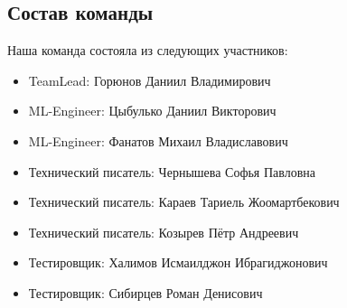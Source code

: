     \subsection{Состав команды}
    Наша команда состояла из следующих участников:
    \begin{itemize} 
        \item TeamLead:	 Горюнов Даниил Владимирович
        \item ML-Engineer: Цыбулько Даниил Викторович
        \item ML-Engineer: Фанатов Михаил Владиславович
        \item Технический писатель: Чернышева Софья Павловна
        \item Технический писатель: Караев Тариель Жоомартбекович
        \item Технический писатель: Козырев Пётр Андреевич
        \item Тестировщик: Халимов Исмаилджон Ибрагиджонович 
        \item Тестировщик: Сибирцев Роман Денисович
    \end{itemize}


